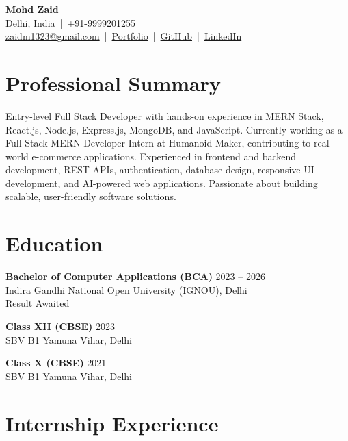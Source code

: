 \documentclass[a4paper,10pt]{article}
\begin{document}
\begin{center}

{\Huge \textbf{Mohd Zaid}} \\[4pt]

Delhi, India \,|\, +91-9999201255 \\
\href{mailto:zaidm1323@gmail.com}{zaidm1323@gmail.com} \,|\,
\href{https://portfolio-blush-alpha-52.vercel.app/}{Portfolio} \,|\,
\href{https://github.com/zaid154}{GitHub} \,|\,
\href{https://www.linkedin.com/in/mohd-zaid-794090231}{LinkedIn}

\end{center}

\section*{Professional Summary}

Entry-level Full Stack Developer with hands-on experience in MERN Stack, React.js, Node.js, Express.js, MongoDB, and JavaScript. Currently working as a Full Stack MERN Developer Intern at Humanoid Maker, contributing to real-world e-commerce applications. Experienced in frontend and backend development, REST APIs, authentication, database design, responsive UI development, and AI-powered web applications. Passionate about building scalable, user-friendly software solutions.

\section*{Education}

\textbf{Bachelor of Computer Applications (BCA)} \hfill 2023 -- 2026 \\
Indira Gandhi National Open University (IGNOU), Delhi \\
Result Awaited

\vspace{3pt}

\textbf{Class XII (CBSE)} \hfill 2023 \\
SBV B1 Yamuna Vihar, Delhi

\vspace{3pt}

\textbf{Class X (CBSE)} \hfill 2021 \\
SBV B1 Yamuna Vihar, Delhi

\section*{Internship Experience}
\end{document}
